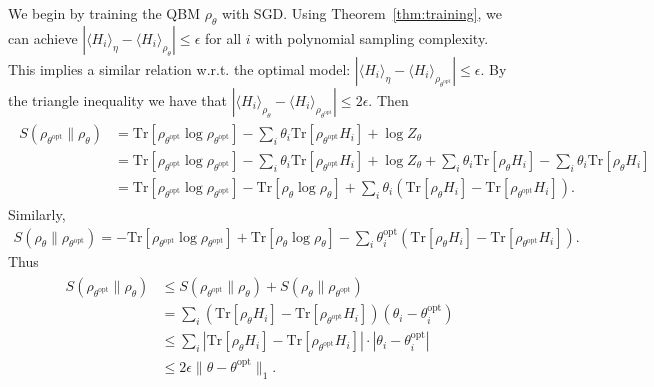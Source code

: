 \documentclass[
    aps,
    prx,
    floatfix,
    nofootinbib,
    onecolumn
]{revtex4-2}
\newcommand{\Tr}{\mathrm{Tr}}
\begin{document}
We begin by training the QBM $\rho_{\theta}$ with SGD. Using Theorem~\ref{thm:training}, we can achieve $|\langle H_{i}\rangle_\eta -\langle H_{i} \rangle_{\rho_\theta} | \leq \epsilon$ for all $i$ with polynomial sampling complexity. This implies a similar relation w.r.t. the optimal model: $| \langle H_{i}\rangle_\eta -\langle H_{i} \rangle_{\rho_{\theta^\mathrm{opt}}} | \leq \epsilon$. By the triangle inequality we have that $| \langle H_{i}\rangle_{\rho_\theta} - \langle H_{i} \rangle_{\rho_{\theta^\mathrm{opt}}} | \leq 2\epsilon$.
Then
\begin{align}
\begin{split}
S(\rho_{\theta^\mathrm{opt}} \| \rho_\theta) &=\Tr[\rho_{\theta^\mathrm{opt}} \log \rho_{\theta^\mathrm{opt}}] - \sum_i \theta_i \Tr[\rho_{\theta^\mathrm{opt}} H_i] + \log{Z_{\theta}} \\
&= \Tr[\rho_{\theta^\mathrm{opt}} \log \rho_{\theta^\mathrm{opt}}] - \sum_i \theta_i \Tr[\rho_{\theta^\mathrm{opt}} H_i] + \log Z_\theta + \sum_i \theta_i \Tr[\rho_{\theta} H_i] -  \sum_i \theta_i \Tr[\rho_{\theta} H_i] \\
&= \Tr[\rho_{\theta^\mathrm{opt}} \log \rho_{\theta^\mathrm{opt}}] - \Tr[\rho_{\theta} \log \rho_{\theta}] + \sum_i \theta_i ( \Tr[\rho_{\theta} H_i] - \Tr[\rho_{\theta^\mathrm{opt}} H_i] ).
\end{split}
\end{align}
Similarly,
\begin{align}
S(\rho_{\theta} \| \rho_{\theta^\mathrm{opt}}) =  - \Tr[\rho_{\theta^\mathrm{opt}} \log \rho_{\theta^\mathrm{opt}}] + \Tr[\rho_{\theta} \log \rho_{\theta}] - \sum_i \theta^\textrm{opt}_i ( \Tr[\rho_{\theta} H_i] - \Tr[\rho_{\theta^\mathrm{opt}} H_i] ). 
\end{align}
Thus
\begin{align}
\begin{split}
\label{eq:up_bound_for_S}
S(\rho_{\theta^\mathrm{opt}} \| \rho_\theta) &\leq S(\rho_{\theta^\mathrm{opt}} \| \rho_\theta) + S(\rho_{\theta} \| \rho_{\theta^\mathrm{opt}}) \\
&= \sum_i ( \Tr[\rho_{\theta} H_i] - \Tr[\rho_{\theta^\mathrm{opt}} H_i] ) ( \theta_i - \theta^\textrm{opt}_i) \\
&\leq \sum_i | \Tr[\rho_{\theta} H_i] - \Tr[\rho_{\theta^\mathrm{opt}} H_i] | \cdot | \theta_i - \theta^\textrm{opt}_i | \\
&\leq 2 \epsilon \| \theta - \theta^\textrm{opt} \|_1 .
\end{split}
\end{align}
\end{document}
